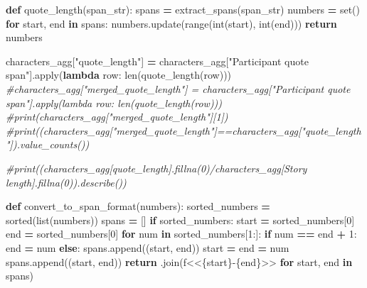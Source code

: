 \documentclass[
]{article}
\newenvironment{Shaded}{\begin{snugshade}}{\end{snugshade}}
\newcommand{\BuiltInTok}[1]{#1}
\newcommand{\CommentTok}[1]{\textcolor[rgb]{0.56,0.35,0.01}{\textit{#1}}}
\newcommand{\ControlFlowTok}[1]{\textcolor[rgb]{0.13,0.29,0.53}{\textbf{#1}}}
\newcommand{\DecValTok}[1]{\textcolor[rgb]{0.00,0.00,0.81}{#1}}
\newcommand{\KeywordTok}[1]{\textcolor[rgb]{0.13,0.29,0.53}{\textbf{#1}}}
\newcommand{\NormalTok}[1]{#1}
\newcommand{\OperatorTok}[1]{\textcolor[rgb]{0.81,0.36,0.00}{\textbf{#1}}}
\newcommand{\SpecialCharTok}[1]{\textcolor[rgb]{0.00,0.00,0.00}{#1}}
\newcommand{\SpecialStringTok}[1]{\textcolor[rgb]{0.31,0.60,0.02}{#1}}
\newcommand{\StringTok}[1]{\textcolor[rgb]{0.31,0.60,0.02}{#1}}
\begin{document}
\begin{Shaded}
\begin{Highlighting}[]
\KeywordTok{def}\NormalTok{ quote\_length(span\_str):}
\NormalTok{  spans }\OperatorTok{=}\NormalTok{ extract\_spans(span\_str)}
\NormalTok{  numbers }\OperatorTok{=} \BuiltInTok{set}\NormalTok{()}
  \ControlFlowTok{for}\NormalTok{ start, end }\KeywordTok{in}\NormalTok{ spans:}
\NormalTok{    numbers.update(}\BuiltInTok{range}\NormalTok{(}\BuiltInTok{int}\NormalTok{(start), }\BuiltInTok{int}\NormalTok{(end)))}
  \ControlFlowTok{return}\NormalTok{ numbers}

\NormalTok{characters\_agg[}\StringTok{"quote\_length"}\NormalTok{] }\OperatorTok{=}\NormalTok{ characters\_agg[}\StringTok{"Participant quote span"}\NormalTok{].}\BuiltInTok{apply}\NormalTok{(}\KeywordTok{lambda}\NormalTok{ row: }\BuiltInTok{len}\NormalTok{(quote\_length(row)))}
\CommentTok{\#characters\_agg["merged\_quote\_length"] = characters\_agg["Participant quote span"].apply(lambda row: len(quote\_length(row)))}
\CommentTok{\#print(characters\_agg["merged\_quote\_length"][1])}
\CommentTok{\#print((characters\_agg["merged\_quote\_length"]==characters\_agg["quote\_length"]).value\_counts())}

\CommentTok{\#print((characters\_agg[\textquotesingle{}quote\_length\textquotesingle{}].fillna(0)/characters\_agg[\textquotesingle{}Story length\textquotesingle{}].fillna(0)).describe())}


\KeywordTok{def}\NormalTok{ convert\_to\_span\_format(numbers):}
\NormalTok{    sorted\_numbers }\OperatorTok{=} \BuiltInTok{sorted}\NormalTok{(}\BuiltInTok{list}\NormalTok{(numbers))}
\NormalTok{    spans }\OperatorTok{=}\NormalTok{ []}
    \ControlFlowTok{if}\NormalTok{ sorted\_numbers:}
\NormalTok{        start }\OperatorTok{=}\NormalTok{ sorted\_numbers[}\DecValTok{0}\NormalTok{]}
\NormalTok{        end }\OperatorTok{=}\NormalTok{ sorted\_numbers[}\DecValTok{0}\NormalTok{]}
        \ControlFlowTok{for}\NormalTok{ num }\KeywordTok{in}\NormalTok{ sorted\_numbers[}\DecValTok{1}\NormalTok{:]:}
            \ControlFlowTok{if}\NormalTok{ num }\OperatorTok{==}\NormalTok{ end }\OperatorTok{+} \DecValTok{1}\NormalTok{:}
\NormalTok{                end }\OperatorTok{=}\NormalTok{ num}
            \ControlFlowTok{else}\NormalTok{:}
\NormalTok{                spans.append((start, end))}
\NormalTok{                start }\OperatorTok{=}\NormalTok{ end }\OperatorTok{=}\NormalTok{ num}
\NormalTok{        spans.append((start, end))}
    \ControlFlowTok{return} \StringTok{\textquotesingle{} \textquotesingle{}}\NormalTok{.join(}\SpecialStringTok{f\textquotesingle{}\textless{}\textless{}}\SpecialCharTok{\{}\NormalTok{start}\SpecialCharTok{\}}\SpecialStringTok{{-}}\SpecialCharTok{\{}\NormalTok{end}\SpecialCharTok{\}}\SpecialStringTok{\textgreater{}\textgreater{}\textquotesingle{}} \ControlFlowTok{for}\NormalTok{ start, end }\KeywordTok{in}\NormalTok{ spans)}


\end{Highlighting}
\end{Shaded}
\end{document}
